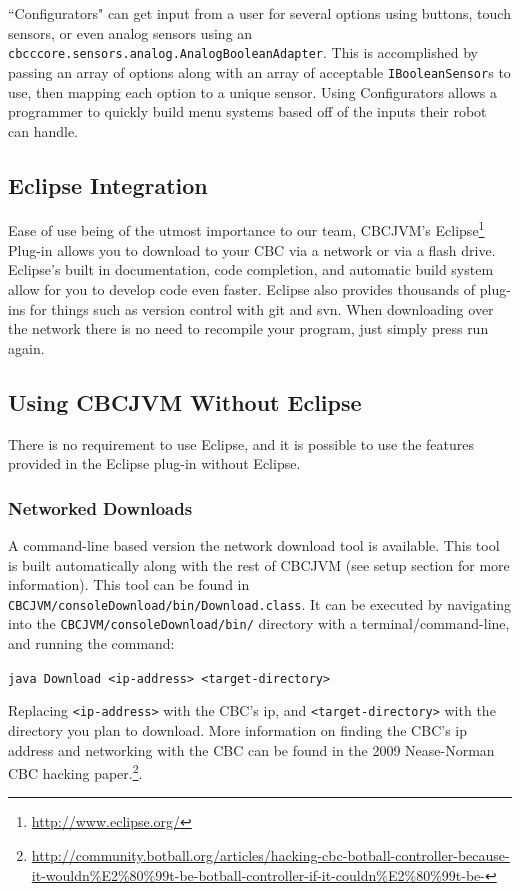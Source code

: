 \documentclass[10pt,letterpaper]{article}
\newcommand{\urlfootnote}[1]{\footnote{\url{#1}}}
\newcommand{\code}[1]{\par\texttt{#1}\par}
\begin{document}
``Configurators" can get input from a user for several options using buttons, touch sensors, or even analog sensors using an \texttt{cbcccore.sensors.analog.AnalogBooleanAdapter}. This is accomplished by passing an array of options along with an array of acceptable \texttt{IBooleanSensor}s to use, then mapping each option to a unique sensor. Using Configurators allows a programmer to quickly build menu systems based off of the inputs their robot can handle.



\subsection{Eclipse Integration}

Ease of use being of the utmost importance to our team, CBCJVM's Eclipse\urlfootnote{http://www.eclipse.org/} Plug-in allows you to download to your CBC via a network or via a flash drive. Eclipse's built in documentation, code completion, and automatic build system allow for you to develop code even faster. Eclipse also provides thousands of plug-ins for things such as version control with git and svn. When downloading over the network there is no need to recompile your program, just simply press run again.



\subsection{Using CBCJVM Without Eclipse}

There is no requirement to use Eclipse, and it is possible to use the features provided in the Eclipse plug-in without Eclipse.



\subsubsection{Networked Downloads}

A command-line based version the network download tool is available. This tool is built automatically along with the rest of CBCJVM (see setup section for more information). This tool can be found in \texttt{CBCJVM/consoleDownload/bin/Download.class}. It can be executed by navigating into the \texttt{CBCJVM/consoleDownload/bin/} directory with a terminal/command-line, and running the command: \code{java Download <ip-address> <target-directory>} Replacing \texttt{<ip-address>} with the CBC's ip, and \texttt{<target-directory>} with the directory you plan to download. More information on finding the CBC's ip address and networking with the CBC can be found in the 2009 Nease-Norman CBC hacking paper.\urlfootnote{http://community.botball.org/articles/hacking-cbc-botball-controller-because-it-wouldn\%E2\%80\%99t-be-botball-controller-if-it-couldn\%E2\%80\%99t-be-}.
\end{document}
